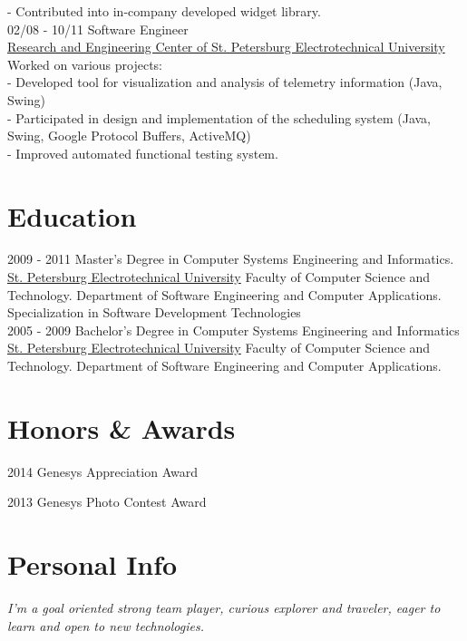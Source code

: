 \documentclass[]{friggeri-cv}
\begin{document}
\begin{entrylist}
{    - Contributed into in-company developed widget library.\\}
    \entry
    {02/08 - 10/11}
    {Software Engineer\\}
    {\href{http://nicetu.spb.ru/index.php/en}{Research and Engineering Center of St. Petersburg Electrotechnical University}}
    {Worked on various projects: \\
    - Developed tool for visualization and analysis of telemetry information (Java, Swing) \\
    - Participated in design and implementation of the scheduling system (Java, Swing, Google Protocol Buffers, ActiveMQ) \\
    - Improved automated functional testing system.}
\end{entrylist}

\newpage

\section{Education}
\begin{entrylist}
  \entry
    {2009 - 2011}
    {Master's Degree in Computer Systems Engineering and Informatics.\\}
    {\href{http://www.eltech.ru/en/}{St. Petersburg Electrotechnical University}}
    {Faculty of Computer Science and Technology. Department of Software Engineering and Computer Applications. Specialization in Software Development Technologies\\}
  \entry
    {2005 - 2009}
    {Bachelor's Degree in Computer Systems Engineering and Informatics\\}
    {\href{http://www.eltech.ru/en/}{St. Petersburg Electrotechnical University}}
    {Faculty of Computer Science and Technology. Department of Software Engineering and Computer Applications.\\}
\end{entrylist}

\section{Honors \& Awards}
\begin{entrylist}
  \entry
    {2014}
    {Genesys Appreciation Award}{}{}
\end{entrylist}

\begin{entrylist}
  \entry
    {2013}
    {Genesys Photo Contest Award}{}{}
\end{entrylist}

\section{Personal Info}
\emph{I'm a goal oriented strong team player, curious explorer and traveler, eager to learn and open to new technologies.}
\end{document}
